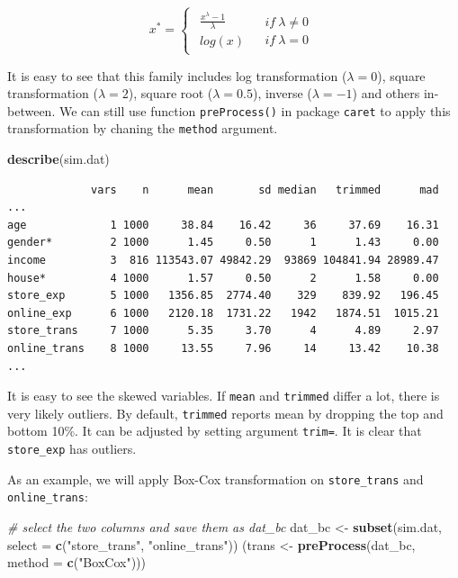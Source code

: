 \documentclass[12pt,]{krantz}
\makeatletter
\newenvironment{Shaded}{\begin{snugshade}}{\end{snugshade}}
\newcommand{\CommentTok}[1]{\textcolor[rgb]{0.37,0.37,0.37}{\textit{#1}}}
\newcommand{\DataTypeTok}[1]{\textcolor[rgb]{0.27,0.27,0.27}{#1}}
\newcommand{\KeywordTok}[1]{\textcolor[rgb]{0.27,0.27,0.27}{\textbf{#1}}}
\newcommand{\NormalTok}[1]{#1}
\newcommand{\StringTok}[1]{\textcolor[rgb]{0.5,0.5,0.5}{#1}}
\newenvironment{kframe}{%
\medskip{}
\setlength{\fboxsep}{.8em}
 \def\at@end@of@kframe{}%
 \ifinner\ifhmode%
  \def\at@end@of@kframe{\end{minipage}}%
  \begin{minipage}{\columnwidth}%
 \fi\fi%
 \def\FrameCommand##1{\hskip\@totalleftmargin \hskip-\fboxsep
 \colorbox{shadecolor}{##1}\hskip-\fboxsep
     \hskip-\linewidth \hskip-\@totalleftmargin \hskip\columnwidth}%
 \MakeFramed {\advance\hsize-\width
   \@totalleftmargin\z@ \linewidth\hsize
   \@setminipage}}%
 {\par\unskip\endMakeFramed%
 \at@end@of@kframe}
\renewenvironment{Shaded}{\begin{kframe}}{\end{kframe}}
\makeatother
\begin{document}
\[
x^{*}=\begin{cases}
\begin{array}{c}
\frac{x^{\lambda}-1}{\lambda}\\
log(x)
\end{array} & \begin{array}{c}
if\ \lambda\neq0\\
if\ \lambda=0
\end{array}\end{cases}
\]

It is easy to see that this family includes log transformation (\(\lambda=0\)), square transformation (\(\lambda=2\)), square root (\(\lambda=0.5\)), inverse (\(\lambda=-1\)) and others in-between. We can still use function \texttt{preProcess()} in package \texttt{caret} to apply this transformation by chaning the \texttt{method} argument.

\begin{Shaded}
\begin{Highlighting}[]
\KeywordTok{describe}\NormalTok{(sim.dat)}
\end{Highlighting}
\end{Shaded}

\begin{verbatim}
             vars    n      mean       sd median   trimmed      mad ...
age             1 1000     38.84    16.42     36     37.69    16.31
gender*         2 1000      1.45     0.50      1      1.43     0.00
income          3  816 113543.07 49842.29  93869 104841.94 28989.47
house*          4 1000      1.57     0.50      2      1.58     0.00
store_exp       5 1000   1356.85  2774.40    329    839.92   196.45
online_exp      6 1000   2120.18  1731.22   1942   1874.51  1015.21
store_trans     7 1000      5.35     3.70      4      4.89     2.97
online_trans    8 1000     13.55     7.96     14     13.42    10.38
...
\end{verbatim}

It is easy to see the skewed variables. If \texttt{mean} and \texttt{trimmed} differ a lot, there is very likely outliers. By default, \texttt{trimmed} reports mean by dropping the top and bottom 10\%. It can be adjusted by setting argument \texttt{trim=}. It is clear that \texttt{store\_exp} has outliers.

As an example, we will apply Box-Cox transformation on \texttt{store\_trans} and \texttt{online\_trans}:

\begin{Shaded}
\begin{Highlighting}[]
\CommentTok{# select the two columns and save them as dat_bc}
\NormalTok{dat_bc <-}\StringTok{ }\KeywordTok{subset}\NormalTok{(sim.dat, }\DataTypeTok{select =} \KeywordTok{c}\NormalTok{(}\StringTok{"store_trans"}\NormalTok{, }\StringTok{"online_trans"}\NormalTok{))}
\NormalTok{(trans <-}\StringTok{ }\KeywordTok{preProcess}\NormalTok{(dat_bc, }\DataTypeTok{method =} \KeywordTok{c}\NormalTok{(}\StringTok{"BoxCox"}\NormalTok{)))}
\end{Highlighting}
\end{Shaded}
\end{document}
